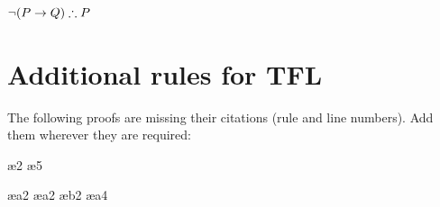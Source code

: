 \begin{earg}
\item $\enot (P \eif Q) \therefore P$
\end{earg}

\setcounter{chapter}{16}

\chapter{Additional rules for TFL}
\label{s:Further}
\setcounter{ProbPart}{0}
\problempart
\label{pr.justifyTFLproof}
The following proofs are missing their citations (rule and line numbers). Add them wherever they are required:
\begin{multicols}{2}
\begin{fitchproof}
\ae{2}
\ae{5}
\end{fitchproof}
\vfill
\begin{fitchproof}
\open
\close
{}
\end{fitchproof}
\columnbreak
\begin{fitchproof}
\open
	\ae{a2}
	\ae{a2}
		\open
		\ae{b2}
	\close
	\ae{a4}
\close
{}
\end{fitchproof}
\end{multicols}

